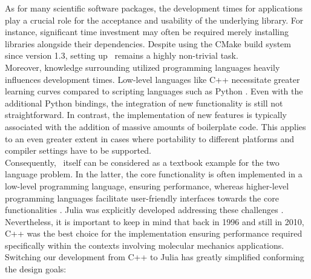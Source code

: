 As for many scientific software packages, the development times for applications play a crucial role for the acceptance and usability of the underlying library. For instance, significant time investment may often be required merely installing libraries alongside their dependencies. Despite using the CMake build system since version 1.3, setting up \ball\ remains a highly non-trivial task. \\
Moreover, knowledge surrounding utilized programming languages heavily influences development times. Low-level languages like C++ necessitate greater learning curves compared to scripting languages such as Python \cite{Ousterhout1998}. 
Even with the additional Python bindings, the integration of new functionality is still not straightforward. In contrast, the implementation of new features is typically associated with the addition of massive amounts of boilerplate code. This applies to an even greater extent in cases where portability to different platforms and compiler settings have to be supported. \\
Consequently, \ball\ itself can be considered as a textbook example for the two language problem. In the latter, the core functionality is often implemented in a low-level programming language, ensuring performance, whereas higher-level programming languages facilitate user-friendly interfaces towards the core functionalities \cite{Julia_what}. Julia was explicitly developed addressing these challenges \cite{Julia_accomplish}.\\ 
Nevertheless, it is important to keep in mind that back in 1996 and still in 2010, C++ was the best choice for the implementation ensuring performance required specifically within the contexts involving molecular mechanics applications. \\
Switching our development from C++ to Julia has greatly simplified conforming the design goals: 
